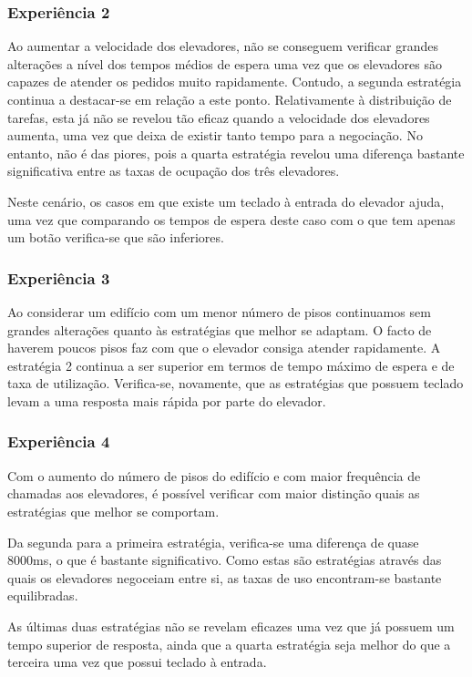 \documentclass[a4paper]{article}
\begin{document}
\subsubsection{Experiência 2}

Ao aumentar a velocidade dos elevadores, não se conseguem verificar grandes alterações a nível dos tempos médios de espera uma vez que os elevadores são capazes de atender os pedidos muito rapidamente. Contudo, a segunda estratégia continua a destacar-se em relação a este ponto. Relativamente à distribuição de tarefas, esta já não se revelou tão eficaz quando a velocidade dos elevadores aumenta, uma vez que deixa de existir tanto tempo para a negociação. No entanto, não é das piores, pois a quarta estratégia revelou uma diferença bastante significativa entre as taxas de ocupação dos três elevadores.

Neste cenário, os casos em que existe um teclado à entrada do elevador ajuda, uma vez que comparando os tempos de espera deste caso com o que tem apenas um botão verifica-se que são inferiores.

\subsubsection{Experiência 3}

Ao considerar um edifício com um menor número de pisos continuamos sem grandes alterações quanto às estratégias que melhor se adaptam. O facto de haverem poucos pisos faz com que o elevador consiga atender rapidamente. A estratégia 2 continua a ser superior em termos de tempo máximo de espera e de taxa de utilização. Verifica-se, novamente, que as estratégias que possuem teclado levam a uma resposta mais rápida por parte do elevador.

\subsubsection{Experiência 4}

Com o aumento do número de pisos do edifício e com maior frequência de chamadas aos elevadores, é possível verificar com maior distinção quais as estratégias que melhor se comportam. 

Da segunda para a primeira estratégia, verifica-se uma diferença de quase 8000ms, o que é bastante significativo. Como estas são estratégias através das quais os elevadores negoceiam entre si, as taxas de uso encontram-se bastante equilibradas.

As últimas duas estratégias não se revelam eficazes uma vez que já possuem um tempo superior de resposta, ainda que a quarta estratégia seja melhor do que a terceira uma vez que possui teclado à entrada.
\end{document}
